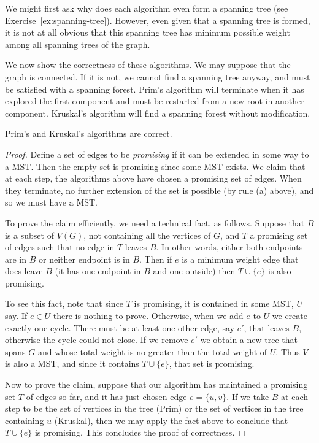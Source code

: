 We might first ask why does each algorithm even form a spanning tree (see
Exercise~\ref{ex:spanning-tree}). However, even given that a spanning
tree is formed, it is not at all obvious that this spanning tree has
minimum possible weight among all spanning trees of the graph.

We now show the correctness of these algorithms. We may suppose that the
graph is connected. If it is not, we cannot find a spanning tree anyway,
and must be satisfied with a spanning forest. Prim's algorithm will
terminate when it has explored the first component and must be
restarted from a new root in another component. Kruskal's algorithm
will find a spanning forest without modification.

\begin{Theorem}
\label{thm:prim-kruskal}
Prim's and Kruskal's algorithms are correct.
\end{Theorem}

\begin{proof}
Define a set of edges to be \emph{promising} if it can be
extended in some way to a MST. Then the empty set is promising since
some MST exists. We claim that at each step, the algorithms above have
chosen a promising set of edges. When they terminate, no further
extension of the set  is possible (by rule (a) above), and so we must
have a MST.

To prove the claim efficiently, we need a technical fact, as follows.
Suppose that $B$ is a subset of $V(G)$, not containing all the vertices
of $G$, and $T$ a promising set of edges such that no edge in $T$ leaves
$B$. In other words, either both endpoints are in $B$ or neither
endpoint is in $B$. Then if $e$ is a minimum weight edge that does leave
$B$ (it has one endpoint in $B$ and one outside) then $T\cup\{e\}$ is
also promising.

To see this fact, note that since $T$ is promising, it is contained in
some MST, $U$ say. If $e\in U$ there is nothing to prove. Otherwise,
when we add $e$ to $U$ we create exactly one cycle. There must be at
least one other edge, say $e'$, that leaves $B$, otherwise the cycle
could not close. If we remove $e'$ we obtain a new tree that spans $G$
and whose total weight is no greater than the total weight of $U$. Thus
$V$ is also a MST, and since it contains $T\cup\{e\}$, that set is
promising.

Now to prove the claim, suppose that our algorithm has maintained a
promising set $T$ of edges so far, and it has just chosen edge $e=\{u,v\}$.
If we take $B$ at each step to be the set of vertices in the tree (Prim)
or the set of vertices in the tree containing $u$ (Kruskal), then we may
apply the fact above to conclude that $T \cup \{e\}$ is promising. This
concludes the proof of correctness.
\end{proof}

